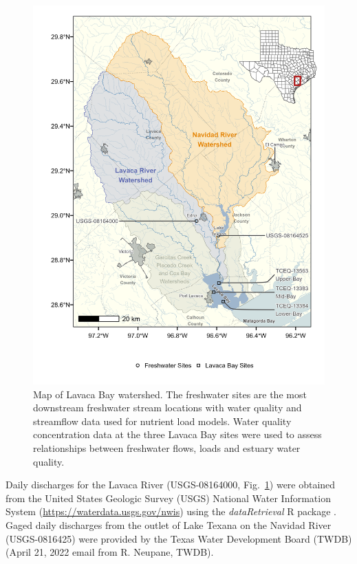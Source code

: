 \documentclass[fleqn,10pt,lineno]{wlpeerj} %
\begin{document}
\begin{figure}

{\centering \includegraphics[width=5.2in,]{Schramm-2023-08-PeerJ_files/figure-latex/fig1} 

}

\caption{Map of Lavaca Bay watershed. The freshwater sites are the most downstream freshwater stream locations with water quality and streamflow data used for nutrient load models. Water quality concentration data at the three Lavaca Bay sites were used to assess relationships between freshwater flows, loads and estuary water quality.}\label{fig:fig1}
\end{figure}

Daily discharges for the Lavaca River (USGS-08164000,
Fig.~\ref{fig:fig1}) were obtained from the United States Geologic
Survey (USGS) National Water Information System
(\url{https://waterdata.usgs.gov/nwis}) using the \emph{dataRetrieval} R
package \autocite{deciccoDataRetrievalPackagesDiscovering2022}. Gaged
daily discharges from the outlet of Lake Texana on the Navidad River
(USGS-0816425) were provided by the Texas Water Development Board (TWDB)
(April 21, 2022 email from R. Neupane, TWDB).
\end{document}

